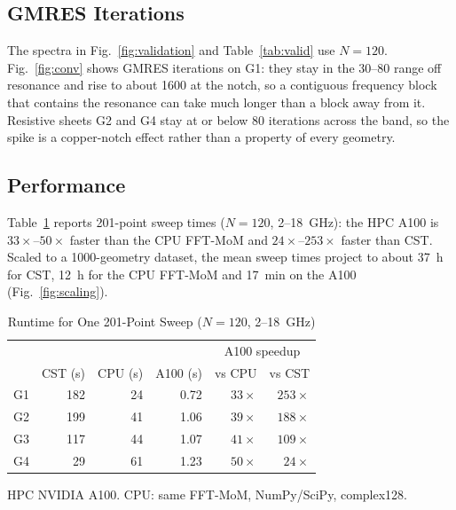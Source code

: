 \documentclass[10pt,conference]{IEEEtran}
\begin{document}
	\subsection{GMRES Iterations}
	
	The spectra in Fig.~\ref{fig:validation} and Table~\ref{tab:valid} use
	$N=120$. Fig.~\ref{fig:conv} shows GMRES iterations on G1: they stay in the
	30--80 range off resonance and rise to about 1600 at the notch, so a
	contiguous frequency block that contains the resonance can take much longer
	than a block away from it. Resistive sheets G2 and G4 stay at or below 80
	iterations across the band, so the spike is a copper-notch effect rather than
	a property of every geometry.
	
	\subsection{Performance}
	
	Table~\ref{tab:perf} reports 201-point sweep times
	($N=120$, 2--18~GHz): the HPC A100 is $33\times$--$50\times$ faster than the
	CPU FFT-MoM and $24\times$--$253\times$ faster than CST. Scaled to a
	1000-geometry dataset, the mean sweep times project to about 37~h for CST,
	12~h for the CPU FFT-MoM and 17~min on the A100 (Fig.~\ref{fig:scaling}).
	
	\begin{table}[t]
		\centering
		\caption{Runtime for One 201-Point Sweep ($N=120$, 2--18~GHz)}
		\label{tab:perf}
		\small
		\begin{tabular*}{\columnwidth}{@{\extracolsep{\fill}}lrrrrr@{}}
			\hline
			& & & & \multicolumn{2}{c}{A100 speedup}\\
			& CST (s) & CPU (s) & A100 (s) & vs CPU & vs CST\\
			\hline
			G1 & 182 & 24 & 0.72 & $33\times$ & $253\times$\\
			G2 & 199 & 41 & 1.06 & $39\times$ & $188\times$\\
			G3 & 117 & 44 & 1.07 & $41\times$ & $109\times$\\
			G4 & 29 & 61 & 1.23 & $50\times$ & $24\times$\\
			\hline
		\end{tabular*}

		\vspace{2pt}
		{\raggedright\footnotesize HPC NVIDIA A100. CPU: same FFT-MoM,
			NumPy/SciPy, complex128.\par}
	\end{table}
\end{document}
